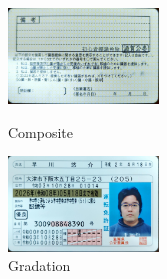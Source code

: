 \documentclass[a4paper,12pt]{jsarticle}
\begin{document}
\begin{figure}[htbp]
    \begin{minipage}[b]{0.45\linewidth}
      \centering
      \includegraphics[width=40mm]{2022_05_27_1.jpg}
      \caption{Composite}
    \end{minipage}
    \begin{minipage}[b]{0.45\linewidth}
      \centering
      \includegraphics[width=40mm]{2022_05_27_2.jpg}
      \caption{Gradation}
    \end{minipage}
  \end{figure}
\end{document}
